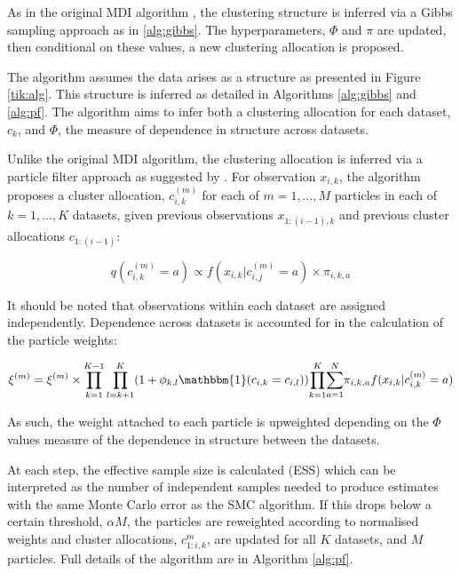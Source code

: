 \documentclass[10pt,a4paper]{article}
\begin{document}
As in the original MDI algorithm \cite{kirk2012bayesian}, the clustering structure is inferred via a Gibbs sampling approach as in \ref{alg:gibbs}. The hyperparameters, $\Phi$ and $\pi$ are updated, then conditional on these values, a new clustering allocation is proposed.

The algorithm assumes the data arises as a structure as presented in Figure \ref{tik:alg}. This structure is inferred as detailed in Algorithms \ref{alg:gibbs} and \ref{alg:pf}. The algorithm aims to infer both a clustering allocation for each dataset, $c_k$, and $\Phi$, the measure of dependence in structure across datasets.

Unlike the original MDI algorithm, the clustering allocation is inferred via a particle filter approach as suggested by . For observation $x_{i, k}$, the algorithm proposes a cluster allocation, $c_{i, k}^{(m)}$ for each of $m = 1,\dots,M$ particles in each of $k = 1,\dots, K$ datasets, given previous observations $x_{1:(i-1),k}$ and previous cluster allocations $c_{1:(i - 1)}$:

\begin{equation}
q(c^{(m)}_{i,k} = a) \propto f(x_{i,k}|c_{i,j}^{(m)} = a) \times \pi_{i, k, a}
\end{equation}

\noindent It should be noted that observations within each dataset are assigned independently. Dependence across datasets is accounted for in the calculation of the particle weights: 

\begin{equation}
\xi^{(m)} = \xi^{(m)} \times {\displaystyle\prod_{k = 1}^{K - 1}\prod_{l = k + 1}^{K}} (1+\phi_{k,l} \mathbbm{1}(c_{i,k} = c_{i,l})) {\displaystyle\prod_{k = 1}^{K}} {\displaystyle \sum_{a = 1}^N}  \pi_{i, k, a} f(x_{i,k}|c_{i,k}^{(m)} = a)
\end{equation}

\noindent As such, the weight attached to each particle is upweighted depending on the $\Phi$ values measure of the dependence in structure between the datasets.

At each step, the effective sample size is calculated (ESS) which can be interpreted as the number of independent samples needed to produce estimates with the same Monte Carlo error as the SMC algorithm\cite{griffin2014sequential}. If this drops below a certain threshold, $\alpha M$, the particles are reweighted according to normalised weights and cluster allocations, $c_{1:i, k}^{m}$, are updated for all $K$ datasets, and $M$ particles. Full details of the algorithm are in Algorithm \ref{alg:pf}.
\end{document}
